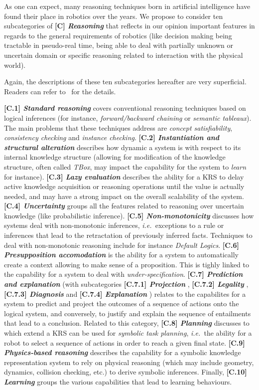 \documentclass{IEEEtran}
\newcommand{\ie}{{\textit{i.e.\ }}}
\newcommand{\taxon}[2]{%
    \textbf{[#1] \emph{#2}}
}
\begin{document}
As one can expect, many reasoning techniques born in artificial intelligence
have found their place in robotics over the years. We propose to consider ten
subcategories of \taxon{C}{Reasoning} that reflects in our opinion important
features in regards to the general requirements of robotics (like decision
making being tractable in pseudo-real time, being able to deal with partially
unknown or uncertain domain or specific reasoning related to interaction with
the physical world).

Again, the descriptions of these ten subcategories hereafter are very
superficial. Readers can refer to~\cite{lemaignan2012symbolic} for the details.

\taxon{C.1}{Standard reasoning} covers conventional reasoning techniques based
on logical inferences (for instance, \emph{forward/backward chaining} or
\emph{semantic tableaux}). The main problems that these techniques address are
\emph{concept satisfiability}, \emph{consistency checking} and \emph{instance
checking}. \taxon{C.2}{Instantiation and structural alteration} describes how
dynamic a system is with respect to its internal knowledge structure (allowing
for modification of the knowledge structure, often called \emph{TBox}, may
impact the capability for the system to \emph{learn} for instance).
\taxon{C.3}{Lazy evaluation} describes the ability for a KRS to delay active
knowledge acquisition or reasoning operations until the value is actually
needed, and may have a strong impact on the overall scalability of the system.
\taxon{C.4}{Uncertainty} groups all the features related to reasoning over
uncertain knowledge (like probabilistic inference).
\taxon{C.5}{Non-monotonicity} discusses how systems deal with non-monotonic
inferences, \ie exceptions to a rule or inferences that lead to the retractation
of previously inferred facts. Techniques to deal with non-monotonic reasoning
include for instance \emph{Default Logics}.  \taxon{C.6}{Presupposition
accomodation} is the ability for a system to automatically create a context
allowing to make sense of a proposition. This is tighly linked to the capability
for a system to deal with \emph{under-specification}. \taxon{C.7}{Prediction and
explanation} (with subcategories \taxon{C.7.1}{Projection},
\taxon{C.7.2}{Legality}, \taxon{C.7.3}{Diagnosis} and
\taxon{C.7.4}{Explanation}) relates to the capabilites for a system to predict
and project the outcomes of a sequence of actions onto the logical system, and
conversely, to justify and explain the sequence of entailments that lead to a
conclusion. Related to this category, \taxon{C.8}{Planning} discusses to which
extend a KRS can be used for \emph{symbolic task planning}, \ie the ability for
a robot to select a sequence of actions in order to reach a given final state.
\taxon{C.9}{Physics-based reasoning} describes the capability for a symbolic
knowledge representation system to rely on physical reasoning (which may include
geometry, dynamics, collision checking, etc.) to derive symbolic inferences.
Finally, \taxon{C.10}{Learning} groups the various capabilities that lead to
learning behaviours.
\end{document}
